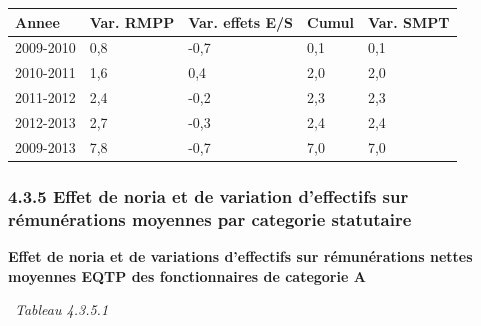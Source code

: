 \begin{longtable}[]{@{}lllll@{}}
\toprule
Annee & Var. RMPP & Var. effets E/S & Cumul & Var. SMPT\tabularnewline
\midrule
\endhead
2009-2010 & 0,8 & -0,7 & 0,1 & 0,1\tabularnewline
2010-2011 & 1,6 & 0,4 & 2,0 & 2,0\tabularnewline
2011-2012 & 2,4 & -0,2 & 2,3 & 2,3\tabularnewline
2012-2013 & 2,7 & -0,3 & 2,4 & 2,4\tabularnewline
2009-2013 & 7,8 & -0,7 & 7,0 & 7,0\tabularnewline
\bottomrule
\end{longtable}

\hypertarget{effet-de-noria-et-de-variation-deffectifs-sur-remunerations-moyennes-par-categorie-statutaire}{%
\subsubsection{4.3.5 Effet de noria et de variation d'effectifs sur
rémunérations moyennes par categorie
statutaire}\label{effet-de-noria-et-de-variation-deffectifs-sur-remunerations-moyennes-par-categorie-statutaire}}

\textbf{Effet de noria et de variations d'effectifs sur rémunérations
nettes moyennes EQTP des fonctionnaires de categorie A}

~\emph{Tableau 4.3.5.1}

